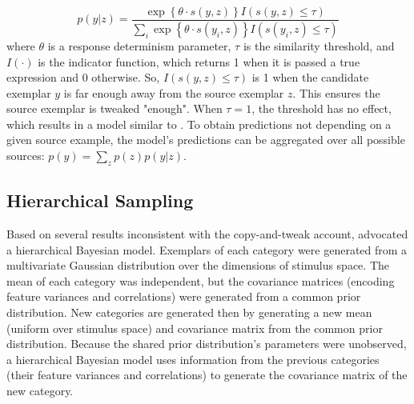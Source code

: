\documentclass[10pt,letterpaper]{article}
\begin{document}
\begin{equation}
    p(y|z)  = \dfrac
    { \exp \left\{\theta \cdot s(y,z) \right\} I\left(s(y,z) \leq \tau\right) }
    {\sum_i{\exp \left\{ \theta \cdot s(y_i,z) \right\} I\left(s(y_i,z) \leq \tau\right)}} 
\end{equation}
% 
where $\theta$ is a response determinism parameter, $\tau$ is the similarity threshold, and $I(\cdot)$ is the indicator function, which returns 1 when it is passed a true expression and 0 otherwise. So, $I\left(s(y,z) \leq \tau\right)$ is 1 when the candidate exemplar $y$ is far enough away from the source exemplar $z$. This ensures the source exemplar is tweaked "enough". When $\tau=1$, the threshold has no effect, which results in a model similar to \citet{jern2013probabilistic}. To obtain predictions not depending on a given source example, the model's predictions can be aggregated over all possible sources: $p(y) = \sum_z{p(z)p(y|z)}$.

\subsection{Hierarchical Sampling}

Based on several results inconsistent with the copy-and-tweak account, \citet{jern2013probabilistic} advocated a hierarchical Bayesian model. Exemplars of each category were generated from a multivariate Gaussian distribution over the dimensions of stimulus space. The mean of each category was independent, but the covariance matrices (encoding feature variances and correlations) were generated from a common prior distribution. New categories are generated then by generating a new mean (uniform over stimulus space) and covariance matrix from the common prior distribution. Because the shared prior distribution's parameters were unobserved, a hierarchical Bayesian model uses information from the previous categories (their feature variances and correlations) to generate the covariance matrix of the new category.
\end{document}

